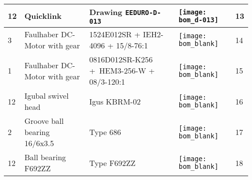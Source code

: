 \begin{tabular}{m{0.5cm} m{5cm} m{5cm} m{1cm} m{1.5cm}}
\hline
12   & Quicklink                                    & Drawing \texttt{EEDURO-D-013}    & \texttt{[image: bom\_d-013]}           & 13    \\
\hline
3    & Faulhaber DC-Motor with gear                 & 1524E012SR + IEH2-4096 + 15/8-76:1 & \texttt{[image: bom\_blank]}         & 14    \\
\hline
1    & Faulhaber DC-Motor with gear                 & 0816D012SR-K256 \mbox{+ HEM3-256-W} + 08/3-120:1 & \texttt{[image: bom\_blank]} & 15 \\
\hline
12   & Igubal swivel head                           & Igus KBRM-02                     & \texttt{[image: bom\_blank]}           & 16    \\
\hline
2    & Groove ball bearing 16/6x3.5                 & Type 686                         & \texttt{[image: bom\_blank]}           & 17    \\
\hline
12   & Ball bearing F692ZZ                          & Type F692ZZ                      & \texttt{[image: bom\_blank]}           & 18    \\
\hline
\end{tabular}

